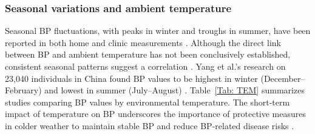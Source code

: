 \documentclass[journal,article,moreauthors]{Definitions/mdpi}
\begin{document}
\subsubsection{Seasonal variations and ambient temperature} 

Seasonal BP fluctuations, with peaks in winter and troughs in summer, have been reported in both home and clinic measurements \citep{Park2019, Sega1998}. Although the direct link between BP and ambient temperature has not been conclusively established, consistent seasonal patterns suggest a correlation \citep{Jansen2001-xl}. Yang et al.'s research on 23,040 individuals in China found BP values to be highest in winter (December--February) and lowest in summer (July--August) \citep{Yang2015-rc}. Table~\ref{Tab: TEM} summarizes studies comparing BP values by environmental temperature. The short-term impact of temperature on BP underscores the importance of protective measures in colder weather to maintain stable BP and reduce BP-related disease risks \citep{Xu2019-rx}.
\end{document}
